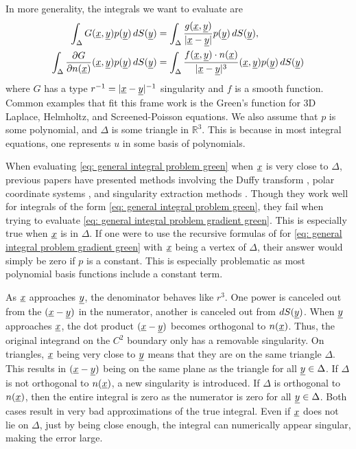\documentclass[../paper.tex]{subfiles}
\begin{document}
In more generality, the integrals we want to evaluate are
\begin{align}
    \int_{\Delta} G(\underline{x}, \underline{y})p(\underline{y})\, dS(\underline{y}) &=  \int_{\Delta} \frac{g(\underline{x}, \underline{y})}{|\underline{x}-\underline{y}|}p(\underline{y})\, dS(\underline{y}), \label{eq: general integral problem green} \\
    \int_{\Delta} \frac{\partial G}{\partial n(\underline{x})}(\underline{x}, \underline{y})p(\underline{y})\, dS(\underline{y}) &= \int_{\Delta} \frac{f(\underline{x}, \underline{y}) \cdot n(\underline{x})}{|\underline{x}-\underline{y}|^3}(\underline{x}, \underline{y})p(\underline{y})\, dS(\underline{y})\label{eq: general integral problem gradient green}
\end{align}
where $G$ has a type $r^{-1} = |\underline{x}-\underline{y}|^{-1}$ singularity and $f$ is a smooth function. Common examples that fit this frame work is the Green's function for 3D Laplace, Helmholtz, and Screened-Poisson equations. We also assume that $p$ is some polynomial, and $\Delta$ is some triangle in $\mathbb{R}^3$. This is because in most integral equations, one represents $u$ in some basis of polynomials.

When evaluating \autoref{eq: general integral problem green} when $\underline{x}$ is very close to $\Delta$, previous papers have presented methods involving the Duffy transform \cite{duffy1982quadrature}, polar coordinate systems \cite{cai2002singularity}, and singularity extraction methods \cite{jarvenpaa2003singularity}. Though they work well for integrals of the form \autoref{eq: general integral problem green}, they fail when trying to evaluate \autoref{eq: general integral problem gradient green}. This is especially true when $\underline{x}$ is in $\Delta$. If one were to use the recursive formulas of \cite{jarvenpaa2003singularity} for \autoref{eq: general integral problem gradient green} with $\underline{x}$ being a vertex of $\Delta$, their answer would simply be zero if $p$ is a constant. This is especially problematic as most polynomial basis functions include a constant term. 

As $\underline{x}$ approaches $\underline{y}$, the denominator behaves like $r^3$. One power is canceled out from the $(\underline{x}-\underline{y})$ in the numerator, another is canceled out from $dS(\underline{y})$. When $\underline{y}$ approaches $\underline{x}$, the dot product $(\underline{x} - \underline{y})$ becomes orthogonal to $n(\underline{x})$. Thus, the original integrand on the $C^2$ boundary only has a removable singularity. On triangles, $\underline{x}$ being very close to $\underline{y}$ means that they are on the same triangle $\Delta$. This results in $(\underline{x}-\underline{y})$ being on the same plane as the triangle for all $\underline{y}\in\Delta$. If $\Delta$ is not orthogonal to $n(\underline{x})$, a new singularity is introduced. If $\Delta$ is orthogonal to $n(\underline{x})$, then the entire integral is zero as the numerator is zero for all $\underline{y}\in\Delta$. Both cases result in very bad approximations of the true integral. 
Even if $\underline{x}$ does not lie on $\Delta$, just by being close enough, the integral can numerically appear singular, making the error large.
\end{document}
